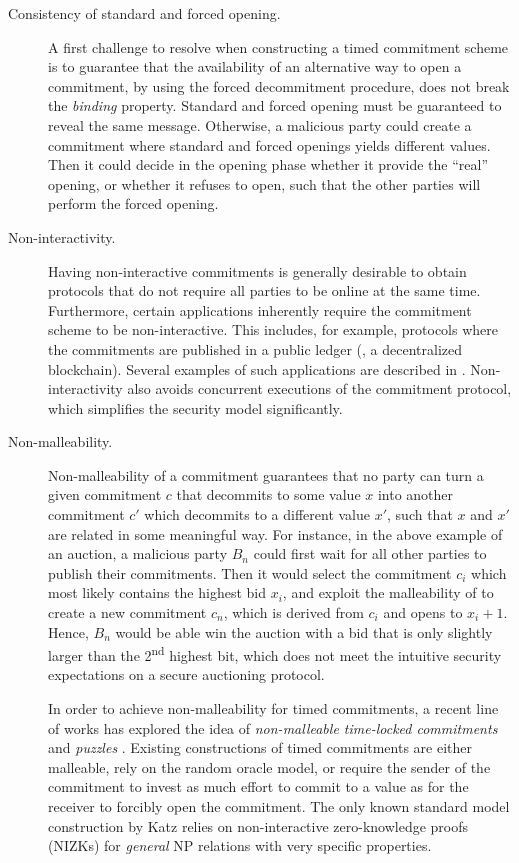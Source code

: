 \begin{description}
	\item[Consistency of standard and forced opening.] A first challenge to resolve when constructing a timed commitment scheme is to guarantee that the availability of an alternative way to open a commitment, by using the forced decommitment procedure, does not break the \emph{binding} property. Standard and forced opening must be guaranteed to reveal the same message. Otherwise, a malicious party could create a commitment where standard and forced openings yields different values. Then it could decide in the opening phase whether it provide the ``real'' opening, or whether it refuses to open, such that the other parties will perform the forced opening.
	
	\item[Non-interactivity.] Having non-interactive commitments is generally desirable to obtain protocols that do not require all parties to be online at the same time. Furthermore, certain applications inherently require the commitment scheme to be non-interactive. This includes, for example, protocols where the commitments are published in a public ledger (\eg, a decentralized blockchain). Several examples of such applications are described in \cite{C:MalThy19}. Non-interactivity also avoids concurrent executions of the commitment protocol, which simplifies the security model significantly.


	\item[Non-malleability.] 
	Non-malleability of a commitment guarantees that no party can turn a given commitment $c$ that decommits to some value $x$ into another commitment $c'$ which decommits to a different value $x'$, such that $x$ and $x'$ are related in some meaningful way.
	For instance, in the above example of an auction, a malicious party $B_n$ could first wait for all other parties to publish their commitments. Then it would select the commitment $c_i$ which most likely contains the highest bid $x_i$, and exploit the malleability of to create a new commitment $c_n$, which is derived from $c_i$ and opens to $x_i + 1$. Hence, $B_n$ would be able win the auction with a bid that is only slightly larger than the 2\textsuperscript{nd} highest bit, which does not meet the intuitive security expectations on a secure auctioning protocol.

	In order to achieve non-malleability for timed commitments, a recent line of works has explored the idea of \emph{non-malleable time-locked commitments} and \emph{puzzles} \cite{TCC:KatLosXu20,EPRINT:EFKP20a,EC:BDDNO21}.
%
%
	Existing constructions of timed commitments are either malleable, rely on the random oracle model, or require the sender of the commitment to invest as much effort to commit to a value as for the receiver to forcibly open the commitment. 
%
	The only known standard model construction by Katz \etal \cite{TCC:KatLosXu20} relies on non-interactive zero-knowledge proofs (NIZKs) for \emph{general} NP relations with very specific properties. 




\end{description}
